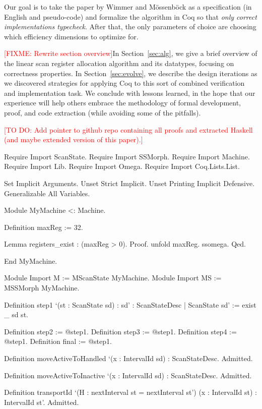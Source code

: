 \documentclass{llncs}
\newif\ifdraft\drafttrue  %
\newcommand{\xcomment}[3]{\ifdraft\textcolor{#1}{[#2: #3]}\else\fi}
\newcommand{\fixme}[1]{\xcomment{red}{FIXME}{#1}}
\newcommand{\todo}[1]{\xcomment{red}{TO DO}{#1}}
\begin{document}
Our goal is to take the paper by Wimmer and M\"{o}ssenb\"{o}ck as a
specification (in English and pseudo-code) and formalize the algorithm in Coq
so that \emph{only correct implementations typecheck}.  After that, the
only parameters of choice are choosing which efficiency dimensions to
optimize for.

\fixme{Rewrite section overview}In Section~\ref{sec:alg}, we give a
brief overview of the linear scan register allocation algorithm and
its datatypes, focusing on correctness properties. In
Section~\ref{sec:evolve}, we describe the design iterations as we
discovered strategies for applying Coq to this sort of combined
verification and implementation task.  We conclude with lessons
learned, in the hope that our experience will help others embrace the
methodology of formal development, proof, and code extraction (while
avoiding some of the pitfalls).

\todo{Add pointer to github repo containing all proofs and extracted
  Haskell (and maybe extended version of this paper).}

\begin{MyCoqEval}
Require Import ScanState.
Require Import SSMorph.
Require Import Machine.
Require Import Lib.
Require Import Omega.
Require Import Coq.Lists.List.

Set Implicit Arguments.
Unset Strict Implicit.
Unset Printing Implicit Defensive.
Generalizable All Variables.

Module MyMachine <: Machine.

Definition maxReg := 32.

Lemma registers_exist : (maxReg > 0).
Proof. unfold maxReg. ssomega. Qed.

End MyMachine.

Module Import M := MScanState MyMachine.
Module Import MS := MSSMorph MyMachine.

Definition step1 `(st : ScanState sd)
  : { sd' : ScanStateDesc | ScanState sd' } :=
  exist _ sd st.

Definition step2 := @step1.
Definition step3 := @step1.
Definition step4 := @step1.
Definition final := @step1.

Definition moveActiveToHandled `(x : IntervalId sd) : ScanStateDesc.
Admitted.

Definition moveActiveToInactive `(x : IntervalId sd) : ScanStateDesc.
Admitted.

Definition transportId `(H : nextInterval st = nextInterval st')
  (x : IntervalId st) : IntervalId st'.
Admitted.
\end{MyCoqEval}
\end{document}
